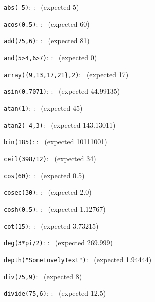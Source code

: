 \documentclass{article}
\begin{document}
 
%


\verb|abs(-5)|:
    :
   \pgfmathresult\ (expected  5)

\verb|acos(0.5)|:
    :
   \pgfmathresult\ (expected  60)

\verb|add(75,6)|:
    :
   \pgfmathresult\ (expected  81)

\verb|and(5>4,6>7)|:
    :
   \pgfmathresult\ (expected  0)

\verb|array({9,13,17,21},2)|:
   \pgfmathresult\ (expected  17)

\verb|asin(0.7071)|:
    :
   \pgfmathresult\ (expected  44.99135)

\verb|atan(1)|:
    :
   \pgfmathresult\ (expected  45)

\verb|atan2(-4,3)|:
   \pgfmathresult\ (expected  143.13011)

\verb|bin(185)|:
    :
   \pgfmathresult\ (expected  10111001)

\verb|ceil(398/12)|:
   \pgfmathresult\ (expected  34)

\verb|cos(60)|:
    :
   \pgfmathresult\ (expected  0.5)

\verb|cosec(30)|:
    :
   \pgfmathresult\ (expected  2.0)

\verb|cosh(0.5)|:
    :
   \pgfmathresult\ (expected  1.12767)

\verb|cot(15)|:
    :
   \pgfmathresult\ (expected  3.73215)

\verb|deg(3*pi/2)|:
    :
   \pgfmathresult\ (expected  269.999)

\verb|depth("SomeLovelyText")|:
   \pgfmathresult\ (expected  1.94444)

\verb|div(75,9)|:
   \pgfmathresult\ (expected  8)

\verb|divide(75,6)|:
    :
   \pgfmathresult\ (expected  12.5)
\end{document}
